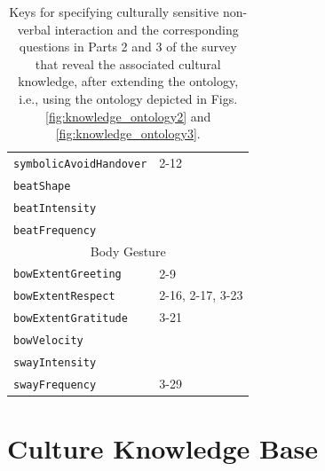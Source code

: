 \documentclass{CSSRforAfrica}
\begin{document}
\begin{table}[H]
\begin{center}
\begin{tabular}{|l l|}
{\footnotesize \verb+symbolicAvoidHandover+} 	  & {\footnotesize 2-12  }\vspace{-1.01mm} \\
{\footnotesize \verb+beatShape+} 	                         & {\footnotesize \verb++}\vspace{-1.01mm} \\
{\footnotesize \verb+beatIntensity+} 	                 & {\footnotesize \verb++} \vspace{-1.01mm}\\
{\footnotesize \verb+beatFrequency+} 	                 & {\footnotesize \verb++} \\
\hline
\multicolumn{2}{|c|}{{\footnotesize Body Gesture}} \\
\hline
{\footnotesize \verb+bowExtentGreeting+} 	                        & {\footnotesize 2-9} \vspace{-1.01mm}\\
{\footnotesize \verb+bowExtentRespect+} 	                        & {\footnotesize 2-16, 2-17, 3-23} \vspace{-1.01mm}\\
{\footnotesize \verb+bowExtentGratitude+} 	                        & {\footnotesize  3-21} \vspace{-1.01mm}\\
{\footnotesize \verb+bowVelocity+}                       & {\footnotesize  } \vspace{-1.01mm}\\
{\footnotesize \verb+swayIntensity+} 	                & {\footnotesize  } \vspace{-1.01mm}\\
{\footnotesize \verb+swayFrequency+} 	                & {\footnotesize 3-29} \\
\hline \hline
\end{tabular}
\end{center}
\vspace{-6mm}
\caption{Keys for specifying culturally sensitive non-verbal interaction and the corresponding questions in Parts 2 and 3 of the survey that reveal the associated cultural knowledge, after extending the ontology, i.e., using the ontology depicted in Figs. \ref{fig:knowledge_ontology2} and \ref{fig:knowledge_ontology3}.}
\label{table:key-value_questions_nonverbal}
\end{table}



\section{Culture Knowledge Base}
\label{section:knowledge_base}
\end{document}
